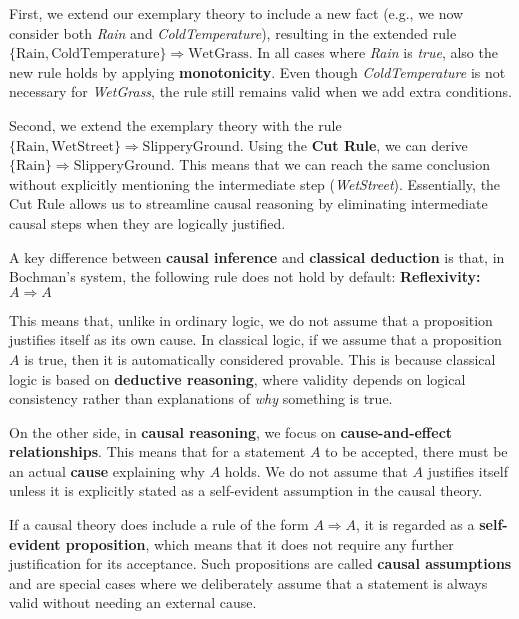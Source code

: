 \documentclass[seminar,palatino,english]{AIGpaper}
\begin{document}
\begin{tcolorbox}[colframe=black!40, colback=gray!10, title=\textbf{Example: Monotonicity and Cut Rule}]

First, we extend our exemplary theory to include a new fact (e.g., we now consider both \textit{Rain} and \textit{ColdTemperature}), resulting in the extended rule $ \{ \text{Rain}, \text{ColdTemperature}  \} \Rightarrow \text{WetGrass}$. In all cases where \textit{Rain} is \textit{true}, also the new rule holds by applying \textbf{monotonicity}. Even though \textit{ColdTemperature} is not necessary for \textit{WetGrass}, the rule still remains valid when we add extra conditions.

Second, we extend the exemplary theory with the rule $ \{ \text{Rain}, \text{WetStreet} \} \Rightarrow \text{SlipperyGround} $. Using the \textbf{Cut Rule}, we can derive $ \{ \text{Rain} \} \Rightarrow \text{SlipperyGround} $. This means that we can reach the same conclusion without explicitly mentioning the intermediate step (\textit{WetStreet}). Essentially, the Cut Rule allows us to streamline causal reasoning by eliminating intermediate causal steps when they are logically justified.
\end{tcolorbox}

A key difference between \textbf{causal inference} and \textbf{classical deduction} is that, in Bochman’s system, the following rule does not hold by default: \textbf{Reflexivity:} $ A \Rightarrow A $

This means that, unlike in ordinary logic, we do not assume that a proposition justifies itself as its own cause. In classical logic, if we assume that a proposition $ A $ is true, then it is automatically considered provable. This is because classical logic is based on \textbf{deductive reasoning}, where validity depends on logical consistency rather than explanations of \textit{why} something is true.

On the other side, in \textbf{causal reasoning}, we focus on \textbf{cause-and-effect relationships}. This means that for a statement $ A $ to be accepted, there must be an actual \textbf{cause} explaining why $ A $ holds. We do not assume that $ A $ justifies itself unless it is explicitly stated as a self-evident assumption in the causal theory.

If a causal theory does include a rule of the form $ A \Rightarrow A $, it is regarded as a \textbf{self-evident proposition}, which means that it does not require any further justification for its acceptance. Such propositions are called \textbf{causal assumptions} and are special cases where we deliberately assume that a statement is always valid without needing an external cause.
\end{document}
